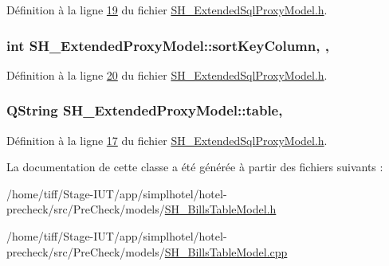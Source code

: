 Définition à la ligne \hyperlink{SH__ExtendedSqlProxyModel_8h_source_l00019}{19} du fichier \hyperlink{SH__ExtendedSqlProxyModel_8h_source}{S\-H\-\_\-\-Extended\-Sql\-Proxy\-Model.\-h}.

\hypertarget{classSH__ExtendedProxyModel_a47e2d0b99b84fb066438db667dd1ad26}{
\subsubsection[{sort\-Key\-Column}]{\setlength{\rightskip}{0pt plus 5cm}int S\-H\-\_\-\-Extended\-Proxy\-Model\-::sort\-Key\-Column\hspace{0.3cm}{\ttfamily [read]}, {\ttfamily [write]}, {\ttfamily [inherited]}}}\label{classSH__ExtendedProxyModel_a47e2d0b99b84fb066438db667dd1ad26}


Définition à la ligne \hyperlink{SH__ExtendedSqlProxyModel_8h_source_l00020}{20} du fichier \hyperlink{SH__ExtendedSqlProxyModel_8h_source}{S\-H\-\_\-\-Extended\-Sql\-Proxy\-Model.\-h}.

\hypertarget{classSH__ExtendedProxyModel_a7eef4557a77444e9ce5c24c180392bfa}{
\subsubsection[{table}]{\setlength{\rightskip}{0pt plus 5cm}Q\-String S\-H\-\_\-\-Extended\-Proxy\-Model\-::table\hspace{0.3cm}{\ttfamily [read]}, {\ttfamily [inherited]}}}\label{classSH__ExtendedProxyModel_a7eef4557a77444e9ce5c24c180392bfa}


Définition à la ligne \hyperlink{SH__ExtendedSqlProxyModel_8h_source_l00017}{17} du fichier \hyperlink{SH__ExtendedSqlProxyModel_8h_source}{S\-H\-\_\-\-Extended\-Sql\-Proxy\-Model.\-h}.



La documentation de cette classe a été générée à partir des fichiers suivants \-:\begin{DoxyCompactItemize}
\item 
/home/tiff/\-Stage-\/\-I\-U\-T/app/simplhotel/hotel-\/precheck/src/\-Pre\-Check/models/\hyperlink{SH__BillsTableModel_8h}{S\-H\-\_\-\-Bills\-Table\-Model.\-h}\item 
/home/tiff/\-Stage-\/\-I\-U\-T/app/simplhotel/hotel-\/precheck/src/\-Pre\-Check/models/\hyperlink{SH__BillsTableModel_8cpp}{S\-H\-\_\-\-Bills\-Table\-Model.\-cpp}\end{DoxyCompactItemize}
